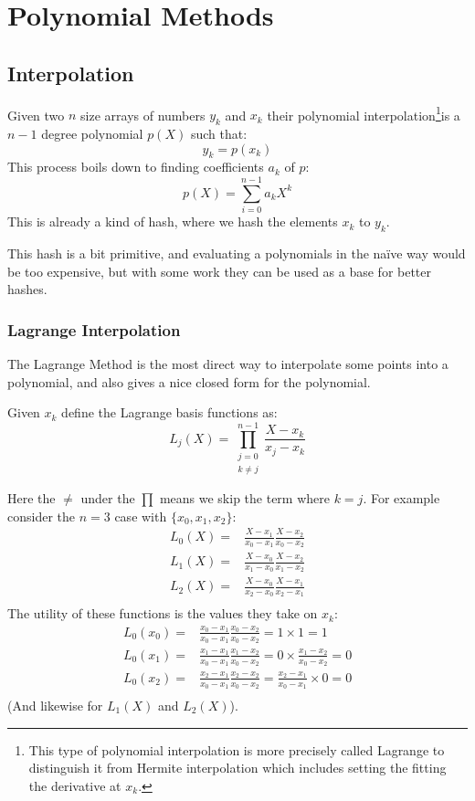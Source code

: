 
\chapter{Polynomial Methods}

\section{Interpolation}
Given two $n$ size arrays of numbers $y_k$ and $x_k$ their polynomial interpolation\footnote{
	This type of polynomial interpolation is more precisely called Lagrange to distinguish it from Hermite interpolation which includes setting the fitting the derivative at $x_k$.
}is a $n-1$ degree polynomial $p(X)$ such that:
\[y_k = p(x_k)\]
This process boils down to finding coefficients $a_k$ of $p$:
\[p(X) = \sum_{i=0}^{n-1}a_kX^k\]
This is already a kind of hash,
where we hash the elements $x_k$ to $y_k$.

This hash is a bit primitive,
and evaluating a polynomials in the naïve way would be too expensive,
but with some work they can be used as a base for better hashes.

\subsection{Lagrange Interpolation} 
The Lagrange Method is the most direct way to interpolate some points into a polynomial, and also gives a nice closed form for the polynomial.

Given $x_k$ define the Lagrange basis functions as:
\[L_j(X) = \prod_{\substack{j=0 \\k\neq j}}^{n-1}\frac{X-x_k}{x_j-x_k}\]

Here the $\neq$ under the $\prod$ means we skip the term where $k = j$.
For example consider the $n=3$ case with $\{x_0,x_1,x_2\}$:
\begin{equation*}
\begin{aligned}
L_0(X) =& \frac{X-x_1}{x_0-x_1}\frac{X-x_2}{x_0-x_2} \\
L_1(X) =& \frac{X-x_0}{x_1-x_0}\frac{X-x_2}{x_1-x_2} \\
L_2(X) =& \frac{X-x_0}{x_2-x_0}\frac{X-x_1}{x_2-x_1} \\
\end{aligned}
\end{equation*}
The utility of these functions is the values they take on $x_k$:
\begin{equation*}
\begin{aligned}
L_0(x_0) =& \frac{x_0-x_1}{x_0-x_1}\frac{x_0-x_2}{x_0-x_2} = 1\times 1 = 1\\
L_0(x_1) =& \frac{x_1-x_1}{x_0-x_1}\frac{x_1-x_2}{x_0-x_2} = 0\times\frac{x_1-x_2}{x_0-x_2} = 0\\
L_0(x_2) =& \frac{x_2-x_1}{x_0-x_1}\frac{x_2-x_2}{x_0-x_2} = \frac{x_2-x_1}{x_0-x_1}\times 0 = 0\\
\end{aligned}
\end{equation*}
(And likewise for $L_1(X)$ and $L_2(X)$).
\\


